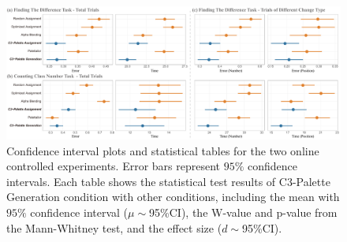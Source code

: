 %
%
%

\begin{figure}[t]
\centering
\includegraphics[width=1\linewidth]{figures/user-result-formal.pdf}
\caption{Confidence interval plots and statistical tables for the two online controlled experiments. Error bars represent $95\%$ confidence intervals. Each table shows the statistical test results of C3-Palette Generation condition with other conditions, including the mean with $95\%$ confidence interval ($\mu\sim$95\%CI), the W-value and p-value from the Mann-Whitney test, and the effect size ($d\sim$95\%CI).
}
\vspace*{-3mm}
\label{fig:userResults}
\end{figure}

